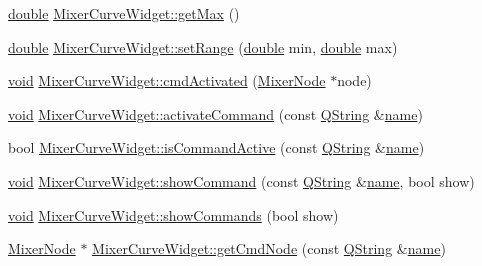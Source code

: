 \begin{DoxyCompactItemize}
\item 
\hyperlink{_super_l_u_support_8h_a8956b2b9f49bf918deed98379d159ca7}{double} \hyperlink{group___u_a_v_object_widget_utils_ga34c76c8602acb8377ecaead69dd32bd0}{Mixer\-Curve\-Widget\-::get\-Max} ()
\item 
\hyperlink{_super_l_u_support_8h_a8956b2b9f49bf918deed98379d159ca7}{double} \hyperlink{group___u_a_v_object_widget_utils_ga282a2d6417e079ff34450ffb620f9898}{Mixer\-Curve\-Widget\-::set\-Range} (\hyperlink{_super_l_u_support_8h_a8956b2b9f49bf918deed98379d159ca7}{double} min, \hyperlink{_super_l_u_support_8h_a8956b2b9f49bf918deed98379d159ca7}{double} max)
\item 
\hyperlink{group___u_a_v_objects_plugin_ga444cf2ff3f0ecbe028adce838d373f5c}{void} \hyperlink{group___u_a_v_object_widget_utils_ga1846362502f57645af53b826ee5537ad}{Mixer\-Curve\-Widget\-::cmd\-Activated} (\hyperlink{class_mixer_node}{Mixer\-Node} $\ast$node)
\item 
\hyperlink{group___u_a_v_objects_plugin_ga444cf2ff3f0ecbe028adce838d373f5c}{void} \hyperlink{group___u_a_v_object_widget_utils_gad39c4c8427b031af1e9042f750301ec8}{Mixer\-Curve\-Widget\-::activate\-Command} (const \hyperlink{group___u_a_v_objects_plugin_gab9d252f49c333c94a72f97ce3105a32d}{Q\-String} \&\hyperlink{glext_8h_ad977737dfc9a274a62741b9500c49a32}{name})
\item 
bool \hyperlink{group___u_a_v_object_widget_utils_ga3922cc5ec0cc7ce3937fbbd2199c1170}{Mixer\-Curve\-Widget\-::is\-Command\-Active} (const \hyperlink{group___u_a_v_objects_plugin_gab9d252f49c333c94a72f97ce3105a32d}{Q\-String} \&\hyperlink{glext_8h_ad977737dfc9a274a62741b9500c49a32}{name})
\item 
\hyperlink{group___u_a_v_objects_plugin_ga444cf2ff3f0ecbe028adce838d373f5c}{void} \hyperlink{group___u_a_v_object_widget_utils_gab84993af05bfcca9d61a15a48ff85a73}{Mixer\-Curve\-Widget\-::show\-Command} (const \hyperlink{group___u_a_v_objects_plugin_gab9d252f49c333c94a72f97ce3105a32d}{Q\-String} \&\hyperlink{glext_8h_ad977737dfc9a274a62741b9500c49a32}{name}, bool show)
\item 
\hyperlink{group___u_a_v_objects_plugin_ga444cf2ff3f0ecbe028adce838d373f5c}{void} \hyperlink{group___u_a_v_object_widget_utils_ga29668291c080a26aa2631f3216755094}{Mixer\-Curve\-Widget\-::show\-Commands} (bool show)
\item 
\hyperlink{class_mixer_node}{Mixer\-Node} $\ast$ \hyperlink{group___u_a_v_object_widget_utils_ga2c1fc49cc5fe0c0b20163b8249d9fabf}{Mixer\-Curve\-Widget\-::get\-Cmd\-Node} (const \hyperlink{group___u_a_v_objects_plugin_gab9d252f49c333c94a72f97ce3105a32d}{Q\-String} \&\hyperlink{glext_8h_ad977737dfc9a274a62741b9500c49a32}{name})

\end{DoxyCompactItemize}
